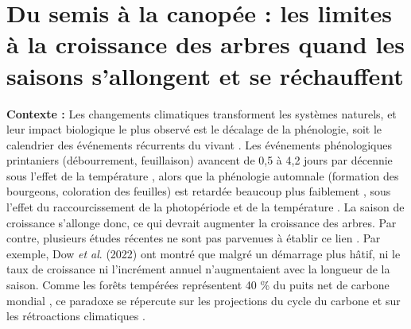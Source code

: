 \documentclass[12pt]{article}
\begin{document}
\pagestyle{fancy}
\fancyhf{}
\fancyfoot[C]{\thepage}
\renewcommand{\headrulewidth}{0pt}


\section*{Du semis à la canopée : les limites à la croissance des arbres quand les saisons s'allongent et se réchauffent}

\textbf{Contexte :} Les changements climatiques transforment les systèmes naturels, et leur impact biologique le plus observé est le décalage de la phénologie, soit le calendrier des événements récurrents du vivant \cite{cleland_shifting_2007}. Les événements phénologiques printaniers (débourrement, feuillaison) avancent de 0,5 à 4,2 jours par décennie \cite{fu_recent_2014} sous l'effet de la température \cite{chuine_why_2010}, alors que la phénologie automnale (formation des bourgeons, coloration des feuilles) est retardée beaucoup plus faiblement \cite{gallinat_autumn_2015}, sous l'effet du raccourcissement de la photopériode et de la température \cite{cooke_dynamic_2012}. La saison de croissance s'allonge donc, ce qui devrait augmenter la croissance des arbres. Par contre, plusieurs études récentes ne sont pas parvenues à établir ce lien \cite{dow_warm_2022,silvestro_longer_2023,matula_shifts_2023}. Par exemple, Dow \textit{et al}. (2022) ont montré que malgré un démarrage plus hâtif, ni le taux de croissance ni l'incrément annuel n'augmentaient avec la longueur de la saison. Comme les forêts tempérées représentent 40 \% du puits net de carbone mondial \cite{gibbs_revised_2025}, ce paradoxe se répercute sur les projections du cycle du carbone et sur les rétroactions climatiques \cite{richardson_climate_2013}. \\
\end{document}
